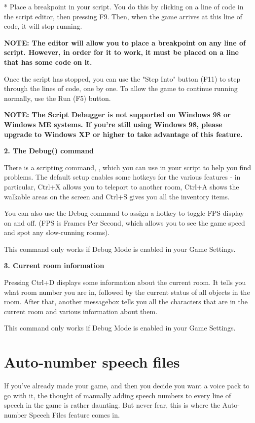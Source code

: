 * Place a breakpoint in your script. You do this by clicking on a line of code
in the script editor, then pressing F9. Then, when the game arrives at this
line of code, it will stop running.

\bf{NOTE:} The editor will allow you to place a breakpoint on any line of script.
However, in order for it to work, it must be placed on a line that has some code on it.

Once the script has stopped, you can use the "Step Into" button (F11) to step through
the lines of code, one by one. To allow the game to continue running normally, use the Run (F5) button.

\bf{NOTE:} The Script Debugger is not supported on Windows 98 or Windows ME systems.
If you're still using Windows 98, please upgrade to Windows XP or higher to take advantage
of this feature.

\bf{2. The Debug() command}

There is a scripting command, , which you can use in your script
to help you find problems. The default setup enables some hotkeys for the various features -
in particular, Ctrl+X allows you to teleport to another room, Ctrl+A shows the walkable
areas on the screen and Ctrl+S gives you all the inventory items.

You can also use the Debug command to assign a hotkey to toggle FPS display on and off.
(FPS is Frames Per Second, which allows you to see the game speed and spot any slow-running
rooms).

This command only works if Debug Mode is enabled in your Game Settings.

\bf{3. Current room information}

Pressing Ctrl+D displays some information about the current room. It tells you what
room number you are in, followed by the current status of all objects in the room. After that,
another messagebox tells you all the characters that are in the current room and various
information about them.

This command only works if Debug Mode is enabled in your Game Settings.


\section{Auto-number speech files}%

If you've already made your game, and then you decide you want a voice pack to go with it,
the thought of manually adding speech numbers to every line of speech in the game is rather
daunting. But never fear, this is where the Auto-number Speech Files feature comes in.

